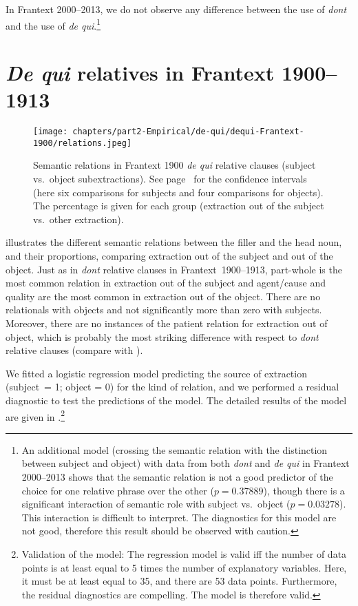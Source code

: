 In Frantext 2000--2013, we do not observe any difference between the use of \emph{dont} and the use of \emph{de qui}.\footnote{An additional model (crossing the semantic relation with the distinction between subject and object) with data from both \emph{dont} and \emph{de qui} in Frantext 2000--2013 shows that the semantic relation is not a good predictor of the choice for one relative phrase over the other ($p=0.37889$), though there is a significant interaction of semantic role with subject vs.\ object ($p= 0.03278$). This interaction is difficult to interpret. The diagnostics for this model are not good, therefore this result should be observed with caution.}

\section{\emph{De qui} relatives in Frantext 1900--1913}


\begin{figure}
        \centering
        \texttt{[image: chapters/part2-Empirical/de-qui/dequi-Frantext-1900/relations.jpeg]}
        \caption[Semantics relations in Frantext 1900 \emph{de qui} relative clauses (subject vs.\ object subextractions)]{Semantic relations in Frantext 1900 \emph{de qui} relative clauses (subject vs.\ object subextractions). See page~\pageref{ch:conf-intervals-binomial} for the confidence intervals (here six comparisons for subjects and four comparisons for objects). The percentage is given for each group (extraction out of the subject vs.\ other extraction).}
        \label{fig:dq1900-relations}
\end{figure}

 illustrates the different semantic relations between the filler and the head noun, and their proportions, comparing extraction out of the subject and out of the object. Just as in \emph{dont} relative clauses in Frantext~1900--1913, part-whole is the most common relation in extraction out of the subject and agent\slash cause and quality are the most common in extraction out of the object. There are no relationals with objects and not significantly more than zero with subjects. Moreover, there are no instances of the patient relation for extraction out of object, which is probably the most striking difference with respect to \emph{dont} relative clauses (compare with ).  

We fitted a logistic regression model predicting the source of extraction (subject~= 1; object = 0) for the kind of relation, and we performed a residual diagnostic to test the predictions of the model. The detailed results of the model are given in .\footnote{Validation of the model: The regression model is valid iff the number of data points is at least equal to 5 times the number of explanatory variables. Here, it must be at least equal to 35, and there are 53 data points. Furthermore, the residual diagnostics are compelling. The model is therefore valid.} 


